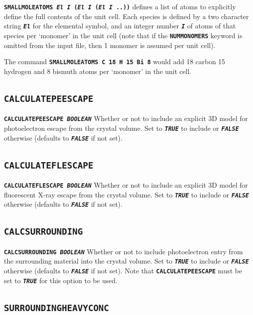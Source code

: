 \documentclass[a4paper]{article}
\newcommand{\Keyword}[1]{\texttt{\textbf{#1}}\xspace}
\begin{document}
\noindent \Keyword{SMALLMOLEATOMS \textit{El I} (\textit{El I} (\textit{El I} ..))}
defines a list of atoms to explicitly define the full contents of the unit cell. Each species is defined by a two character string \Keyword{\textit{El}} for the elemental symbol, and an integer number \Keyword{\textit{I}} of atoms of that species per `monomer' in the unit cell (note that if the  \Keyword{NUMMONOMERS} keyword is omitted from the input file, then 1 monomer is assumed per unit cell).

The command \Keyword{SMALLMOLEATOMS C 18 H 15 Bi 8} would add 18 carbon 15 hydrogen and 8 bismuth atoms per `monomer' in the unit cell.

\subsection{\Keyword{CALCULATEPEESCAPE}}
\label{calculatepeescape}

\noindent \Keyword{CALCULATEPEESCAPE \textit{BOOLEAN}}
Whether or not to include an explicit 3D model for photoelectron escape from the crystal volume. Set to \Keyword{\textit{TRUE}} to include or \Keyword{\textit{FALSE}} otherwise (defaults to \Keyword{\textit{FALSE}} if not set). 

\subsection{\Keyword{CALCULATEFLESCAPE}}
\label{calculateflescape}

\noindent \Keyword{CALCULATEFLESCAPE \textit{BOOLEAN}}
Whether or not to include an explicit 3D model for fluorescent X-ray escape from the crystal volume. Set to \Keyword{\textit{TRUE}} to include or \Keyword{\textit{FALSE}} otherwise (defaults to \Keyword{\textit{FALSE}} if not set).

\subsection{\Keyword{CALCSURROUNDING}}
\label{calcsurrounding}

\noindent \Keyword{CALCSURROUNDING \textit{BOOLEAN}}
Whether or not to include photoelectron entry from the surrounding material into the crystal volume. Set to \Keyword{\textit{TRUE}} to include or \Keyword{\textit{FALSE}} otherwise (defaults to \Keyword{\textit{FALSE}} if not set).
Note that \Keyword{CALCULATEPEESCAPE} must be set to \Keyword{\textit{TRUE}} for this option to be used.

\subsection{\Keyword{SURROUNDINGHEAVYCONC}}
\label{surroundingheavyconc}
\end{document}
